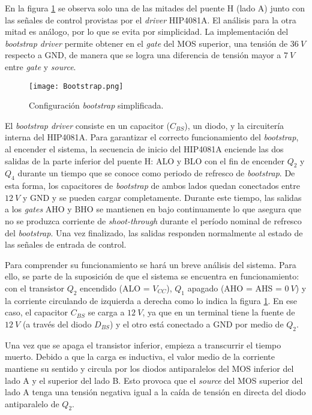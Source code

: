 En la figura \ref{fig:img_bootstrap} se observa solo una de las mitades del puente H (lado A)  junto con las señales de control provistas por el \textsl{driver} HIP4081A. El análisis para la otra mitad es análogo, por lo que se evita por simplicidad. La implementación del \textsl{bootstrap driver} permite obtener en el \textsl{gate} del MOS superior, una tensión de $36\:V$ respecto a GND, de manera que se logra una diferencia de tensión mayor a $7\:V$ entre \textsl{gate} y \textsl{source}. 

\begin{figure}[H]
	\centering
	\texttt{[image: Bootstrap.png]}
	\caption{Configuración \textsl{bootstrap} simplificada.}
	\label{fig:img_bootstrap}
\end{figure}

El \textsl{bootstrap driver} consiste en un capacitor ($C_{BS}$), un diodo, y la circuitería interna del HIP4081A. Para garantizar el correcto funcionamiento del \textsl{bootstrap}, al encender el sistema, la secuencia de inicio del HIP4081A enciende las dos salidas de la parte inferior del puente H: ALO y BLO con el fin de encender $Q_2$ y $Q_4$ durante un tiempo que se conoce como periodo de refresco de \textsl{bootstrap}. De esta forma, los capacitores de \textsl{bootstrap} de ambos lados quedan conectados entre $12\:V$ y GND y se pueden cargar completamente. Durante este tiempo, las salidas a los \textsl{gates} AHO y BHO se mantienen en bajo continuamente lo que asegura que no se produzca corriente de \textsl{shoot-through} durante el período nominal de refresco del \textsl{bootstrap}. Una vez finalizado, las salidas responden normalmente al estado de las señales de entrada de control.

Para comprender su funcionamiento se hará un breve análisis del sistema. Para ello, se parte de la suposición de que el sistema se encuentra en funcionamiento: con el transistor $Q_2$ encendido (ALO = $V_{CC}$), $Q_1$ apagado (AHO = AHS = $0\:V$) y la corriente circulando de izquierda a derecha como lo indica la figura \ref{fig:img_bootstrap}. En ese caso, el capacitor $C_{BS}$ se carga a $12\:V$, ya que en un terminal tiene la fuente de $12\:V$ (a través del diodo $D_{BS}$) y el otro está conectado a GND por medio de $Q_2$.

Una vez que se apaga el transistor inferior, empieza a transcurrir el tiempo muerto. Debido a que la carga es inductiva, el valor medio de la corriente mantiene su sentido y circula por los diodos antiparalelos del MOS inferior del lado A y el superior del lado B. Esto provoca que el \textsl{source} del MOS superior del lado A tenga una tensión negativa igual a la caída de tensión en directa del diodo antiparalelo de $Q_2$. 

